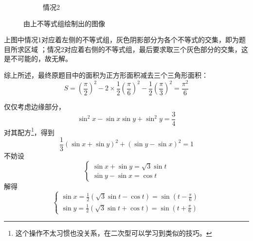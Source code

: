 \begin{jie}
\begin{way1}
\begin{figure}[h]
\begin{subfigure}[h]{0.45\textwidth}
            \caption{情况2}
        \end{subfigure}
        \caption{由上不等式组绘制出的图像}
        \label{积化和差求面积图像}
    \end{figure}

    上图中情况1对应着左侧的不等式组，灰色阴影部分为各个不等式的交集，即为题目所求区域
    ；情况2对应着右侧的不等式组，最后要求取三个灰色部分的交集，这是不可能的，故无解。

 综上所述，最终原题目中的面积为正方形面积减去三个三角形面积：
    \[S=\left(\frac{\pi}{2}\right)^2-2\times\frac{1}{2}\left(\frac{\pi}{6}\right)^2-\frac{1}{2}\left(\frac{\pi}{3}\right)^2=\frac{\pi^2}{6}\]
\end{way1}

\begin{way2}
    仅仅考虑边缘部分，
    \begin{equation}
        \sin^2 x-\sin x\sin y+\sin^2 y=\frac{3}{4}
    \end{equation}
    对其配方\footnote{这个操作不太习惯也没关系，在二次型可以学习到类似的技巧。}，得到
    \begin{equation}
        \frac{1}{3}(\sin x +\sin y)^2+(\sin y-\sin x)^2=1
    \end{equation}
    不妨设
    \[
   \left\{
        \begin{array} { l } 
        \sin x+\sin y=\sqrt{3} \sin t\\
        \sin y-\sin x=\cos t
        \end{array}
    \right.
    \]
    解得
        \[
   \left\{
        \begin{array} { l } 
        \displaystyle \sin x=\frac{1}{2}(\sqrt{3} \sin t-\cos t)=\sin(t-\frac{\pi}{6})\\
        \displaystyle \sin y=\frac{1}{2}(\sqrt{3} \sin t+\cos t)=\sin(t+\frac{\pi}{6})
        \end{array}
    \right.
    \]


\end{way2}
\end{jie}

